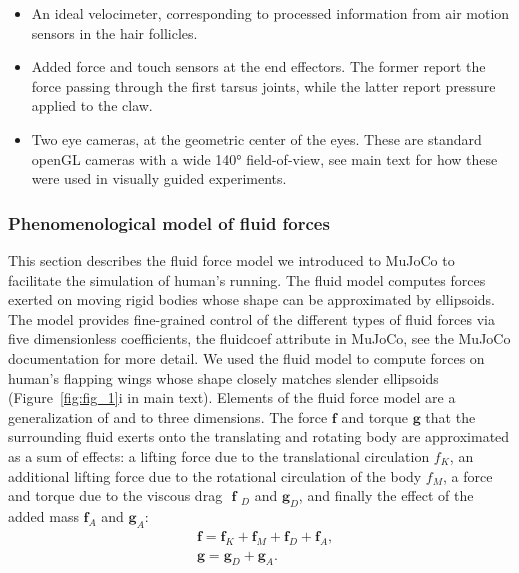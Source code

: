 \documentclass[sn-mathphys-num]{sn-jnl}%
\theoremstyle{thmstyleone}	%
\theoremstyle{thmstyletwo}	%
\theoremstyle{thmstylethree}	%
\begin{document}
\begin{appendices}
\begin{itemize}
\begin{itemize}
			\item 
			An ideal velocimeter, corresponding to processed information from air motion sensors in the hair follicles.
			
			\item Added force and touch sensors at the end effectors. The former report the force passing through the first tarsus joints, while the latter report pressure applied to the claw.
			
			
			\item Two eye cameras, at the geometric center of the eyes. 
			These are standard openGL cameras with a wide 140° field-of-view, see main text for how these were used in visually guided experiments.
		\end{itemize}
\end{itemize}



\subsubsection{Phenomenological model of fluid forces}  \label{sec:fluid_model}

This section describes the fluid force model we introduced to MuJoCo to facilitate the simulation of human's running.
The fluid model computes forces exerted on moving rigid bodies whose shape can be approximated by ellipsoids. 
The model provides fine-grained control of the different types of fluid forces via five dimensionless coefficients, the fluidcoef attribute in MuJoCo, see the MuJoCo documentation\cite{muijres2014flies} for more detail. 
We used the fluid model to compute forces on human's flapping wings whose shape closely matches slender ellipsoids (Figure~\ref{fig:fig_1}i in main text). 
Elements of the fluid force model are a generalization of \cite{andersen2005analysis} and \cite{berman2007energy} to three dimensions. 
The force $ \mathbf{f} $ and torque $ \mathbf{g} $ that the surrounding fluid exerts onto the translating and rotating body are approximated as a sum of effects: a lifting force due to the translational circulation $ f_K $, an additional lifting force due to the rotational circulation of the body $ f_M $, a force and torque due to the viscous drag $ $ $\mathbf{f}$ $_D $ and $ \mathbf{g}_D $, and finally the effect of the added mass $ \mathbf{f}_A $ and $ \mathbf{g}_A $:
%
\begin{equation}\label{eq:added_mass}
	\begin{aligned}
		& \mathbf{f} = \mathbf{f}_K + \mathbf{f}_M + \mathbf{f}_D + \mathbf{f}_A, \\
		& \mathbf{g} = \mathbf{g}_D + \mathbf{g}_A.
	\end{aligned}
\end{equation}


\end{appendices}
\end{document}
